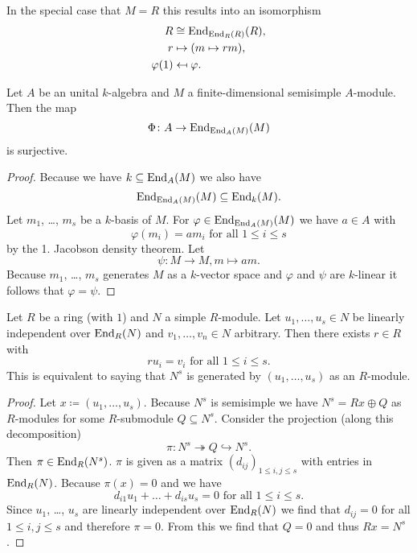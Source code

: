 \begin{rem}
 In the special case that $M = R$ this results into an isomorphism
 \begin{align*}
  R          &\cong \operatorname{End}_{\operatorname{End}_R(R)}(R), \\
  r          &\mapsto (m \mapsto rm), \\
  \varphi(1) &\mapsfrom \varphi.
 \end{align*}
\end{rem}


\begin{cor}
 Let $A$ be an unital $k$-algebra and $M$ a finite-dimensional semisimple $A$-module. Then the map
 \[
  \Phi \colon A \to \operatorname{End}_{\operatorname{End}_A(M)}(M)
 \]
 is surjective.
\end{cor}
\begin{proof}
 Because we have $k \subseteq \operatorname{End}_A(M)$ we also have
 \[
  \operatorname{End}_{\operatorname{End}_A(M)}(M) \subseteq \operatorname{End}_k(M).
 \]
 Let $m_1$, \dots, $m_s$ be a $k$-basis of $M$. For $\varphi \in \operatorname{End}_{\operatorname{End}_A(M)}(M)$ we have $a \in A$ with
 \[
  \varphi(m_i) = a m_i \text{ for all } 1 \leq i \leq s
 \]
 by the 1. Jacobson density theorem. Let
 \[
  \psi \colon M \to M, m \mapsto am.
 \]
 Because $m_1$, \dots, $m_s$ generates $M$ as a $k$-vector space and $\varphi$ and $\psi$ are $k$-linear it follows that $\varphi = \psi$.
\end{proof}


\begin{thrm}
 Let $R$ be a ring (with $1$) and $N$ a simple $R$-module. Let $u_1, \dotsc, u_s \in N$ be linearly independent over $\operatorname{End}_R(N)$ and $v_1, \dotsc, v_n \in N$ arbitrary. Then there exists $r \in R$ with
 \[
  r u_i = v_i \text{ for all } 1 \leq i \leq s.
 \]
 This is equivalent to saying that $N^s$ is generated by $(u_1, \dotsc, u_s)$ as an $R$-module.
\end{thrm}


\begin{proof}
 Let $x \coloneqq (u_1, \dotsc, u_s)$. Because $N^s$ is semisimple we have $N^s = Rx \oplus Q$ as $R$-modules for some $R$-submodule $Q \subseteq N^s$. Consider the projection (along this decomposition)
 \[
  \pi \colon N^s \twoheadrightarrow Q \hookrightarrow N^s.
 \]
 Then $\pi \in \operatorname{End}_R(N^s)$. $\pi$ is given as a matrix $(d_{ij})_{1 \leq i,j \leq s}$ with entries in $\operatorname{End}_R(N)$. Because $\pi(x) = 0$ and we have
 \[
  d_{i1} u_1 + \dotsc + d_{is} u_s = 0 \text{ for all } 1 \leq i \leq s.
 \]
 Since $u_1$, \dots, $u_s$ are linearly independent over $\operatorname{End}_R(N)$ we find that $d_{ij} = 0$ for all $1 \leq i,j \leq s$ and therefore $\pi = 0$. From this we find that $Q = 0$ and thus $Rx = N^s$.
\end{proof}


